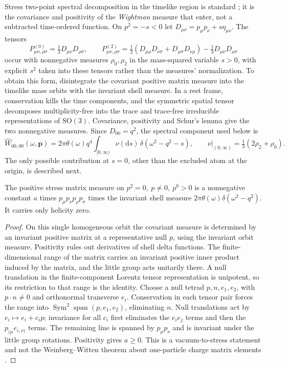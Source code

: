 \documentclass[11pt]{article}
\newcommand{\dd}{\mathrm d}
\newcommand{\Mink}{\eta}
\newcommand{\pn}{\boldsymbol p}
\begin{document}
Stress two-point spectral decomposition in the timelike region is standard \cite{CFL,Karateev}; it is the covariance and positivity of the \emph{Wightman} measure that enter, not a subtracted time-ordered function. On \(p^2=-s<0\) let \(D_{\mu\nu}=p_\mu p_\nu+s\Mink_{\mu\nu}\). The tensors
\[
 P^{(0)}_{\mu\nu,\rho\sigma}=\tfrac13D_{\mu\nu}D_{\rho\sigma},\qquad
 P^{(2)}_{\mu\nu,\rho\sigma}=
 \tfrac12(D_{\mu\rho}D_{\nu\sigma}+D_{\mu\sigma}D_{\nu\rho})-
 \tfrac13D_{\mu\nu}D_{\rho\sigma}
\]
occur with nonnegative measures \(\rho_0,\rho_2\) in the mass-squared variable \(s>0\), with explicit \(s^2\) taken into these tensors rather than the measures' normalization. To obtain this form, disintegrate the covariant positive matrix measure into the timelike mass orbits with the invariant shell measure. In a rest frame, conservation kills the time components, and the symmetric spatial tensor decomposes multiplicity-free into the trace and trace-free irreducible representations of \(\mathrm{SO}(3)\). Covariance, positivity and Schur's lemma give the two nonnegative measures. Since \(D_{00}=q^2\), the spectral component used below is
\begin{equation}
 \widehat W_{00,00}(\omega,\pn)
  =2\pi\theta(\omega)q^4 \int_{[0,\infty)}\nu(\dd s)\,
       \delta(\omega^2-q^2-s),\qquad
 \nu|_{(0,\infty)}=\tfrac13(2\rho_2+\rho_0).
 \label{spec}
\end{equation}
The only possible contribution at \(s=0\), other than the excluded atom at the origin, is described next.

\begin{lemma}\label{lemma}
The positive stress matrix measure on \(p^2=0,\ p\ne0,\ p^0>0\) is a nonnegative constant \(a\) times \(p_\mu p_\nu p_\rho p_\sigma\) times the invariant shell measure \(2\pi\theta(\omega)\delta(\omega^2-q^2)\). It carries only helicity zero.
\end{lemma}
\begin{proof}
On this single homogeneous orbit the covariant measure is determined by an invariant positive matrix at a representative null \(p\), using the invariant orbit measure. Positivity rules out derivatives of shell delta functions. The finite-dimensional range of the matrix carries an invariant positive inner product induced by the matrix, and the little group acts unitarily there. A null translation in the finite-component Lorentz tensor representation is unipotent, so its restriction to that range is the identity. Choose a null tetrad \(p,n,e_1,e_2\), with \(p\cdot n\ne0\) and orthonormal transverse \(e_i\). Conservation in each tensor pair forces the range into \(\operatorname{Sym}^2\operatorname{span}(p,e_1,e_2)\), eliminating \(n\). Null translations act by \(e_i\mapsto e_i+c_i p\); invariance for all \(c_i\) first eliminates the \(e_i e_j\) terms and then the \(p_{(\mu}e_{i,\nu)}\) terms. The remaining line is spanned by \(p_\mu p_\nu\) and is invariant under the little group rotations. Positivity gives \(a\ge0\). This is a vacuum-to-stress statement and not the Weinberg--Witten theorem about one-particle charge matrix elements \cite{WW}.
\end{proof}
\end{document}
